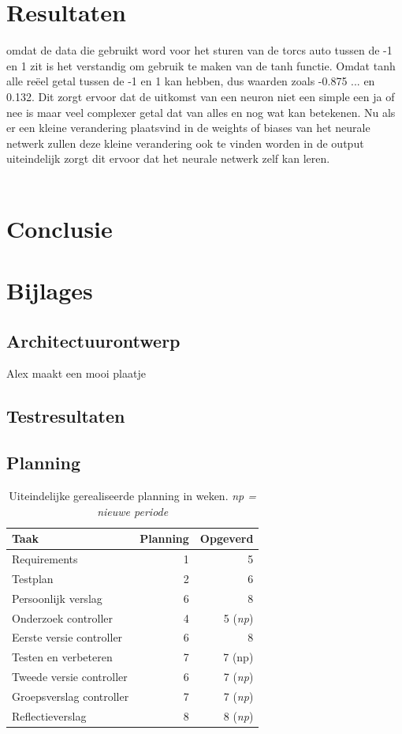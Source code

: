 \documentclass{article}
\begin{document}
\section{Resultaten}
omdat de data die gebruikt word voor het sturen van de torcs auto tussen de -1 en 1 zit is het verstandig om gebruik te maken van de tanh functie. Omdat tanh alle reëel getal tussen de -1 en 1 kan hebben, dus waarden zoals -0.875 ... en 0.132. Dit zorgt ervoor dat de uitkomst van een neuron niet een simple een ja of nee is maar veel complexer getal dat van alles en nog wat kan betekenen. Nu als er een kleine verandering plaatsvind in de weights of biases van het neurale netwerk zullen deze kleine verandering ook te vinden worden in de output uiteindelijk zorgt dit ervoor dat het neurale netwerk zelf kan leren.\\\\
\section{Conclusie}

\pagebreak
\section{Bijlages}
\subsection{Architectuurontwerp}
Alex maakt een mooi plaatje

\subsection{Testresultaten}


\pagebreak
\subsection{Planning}
\label{uiteind-plan}
\begin{table}[h!]
\begin{tabular}{lrr}
 \textbf{Taak} & \textbf{Planning} & \textbf{Opgeverd} \\ \hline
 Requirements & 1 & 5 \\
 Testplan & 2 & 6 \\
 Persoonlijk verslag & 6 & 8 \\
 Onderzoek controller & 4 & 5 (\textit{np}) \\
 Eerste versie controller & 6 & 8 \\
 Testen en verbeteren & 7 & 7 (np) \\
 Tweede versie controller & 6 & 7 (\textit{np}) \\
 Groepsverslag controller & 7 & 7 (\textit{np}) \\
 Reflectieverslag & 8 & 8 (\textit{np})  \\
\end{tabular}
\caption{Uiteindelijke gerealiseerde planning in weken. \textit{np = nieuwe periode}}
\end{table}
\newpage


%

\end{document}
